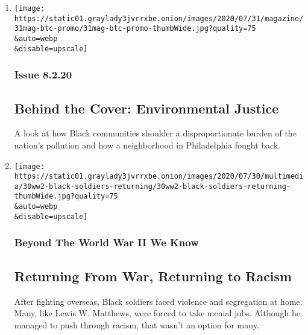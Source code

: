 \begin{enumerate}
\def\labelenumi{\arabic{enumi}.}
\item
  \href{/2020/07/31/magazine/behind-the-cover-environmental-justice.html}{}

  \texttt{[image: https://static01.graylady3jvrrxbe.onion/images/2020/07/31/magazine/31mag-btc-promo/31mag-btc-promo-thumbWide.jpg?quality=75\\\&auto=webp\\\&disable=upscale]}

  \hypertarget{issue-8220}{%
  \subsubsection{Issue 8.2.20}\label{issue-8220}}

  \hypertarget{behind-the-cover-environmental-justice}{%
  \subsection{Behind the Cover: Environmental
  Justice}\label{behind-the-cover-environmental-justice}}

  A look at how Black communities shoulder a disproportionate burden of
  the nation's pollution and how a neighborhood in Philadelphia fought
  back.
\item
  \href{/2020/07/30/magazine/black-soldiers-wwii-racism.html}{}

  \texttt{[image: https://static01.graylady3jvrrxbe.onion/images/2020/07/30/multimedia/30ww2-black-soldiers-returning/30ww2-black-soldiers-returning-thumbWide.jpg?quality=75\\\&auto=webp\\\&disable=upscale]}

  \hypertarget{beyond-the-world-war-ii-we-know}{%
  \subsubsection{Beyond The World War II We
  Know}\label{beyond-the-world-war-ii-we-know}}

  \hypertarget{returning-from-war-returning-to-racism}{%
  \subsection{Returning From War, Returning to
  Racism}\label{returning-from-war-returning-to-racism}}

  After fighting overseas, Black soldiers faced violence and segregation
  at home. Many, like Lewis W. Matthews, were forced to take menial
  jobs. Although he managed to push through racism, that wasn't an
  option for many.


\end{enumerate}
